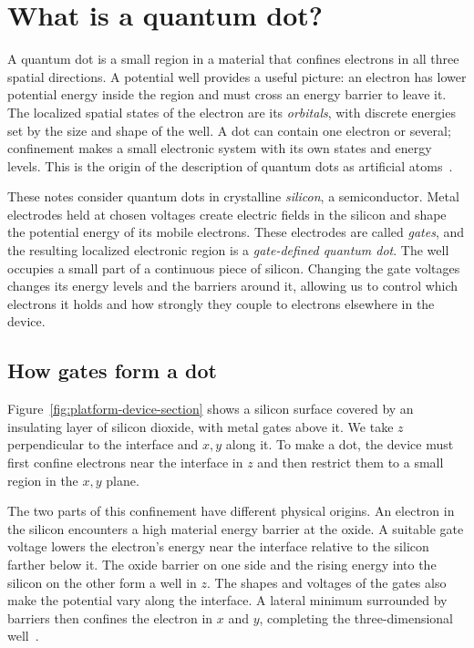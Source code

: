 \section{What is a quantum dot?}
\label{sec:quantum-dot-introduction}

A quantum dot is a small region in a material that confines electrons
in all three spatial directions. A potential well provides a useful
picture: an electron has lower potential energy inside the region and
must cross an energy barrier to leave it. The localized spatial states
of the electron are its \emph{orbitals}, with discrete energies set by
the size and shape of the well. A dot can contain one electron or several;
confinement makes a small electronic system with its own states and
energy levels. This is the origin of the description of quantum dots
as artificial atoms~\cite{Oosterkamp1998}.

These notes consider quantum dots in crystalline \emph{silicon}, a
semiconductor. Metal electrodes held at chosen voltages create electric
fields in the silicon and shape the potential energy of its mobile
electrons. These electrodes are called \emph{gates}, and the resulting
localized electronic region is a \emph{gate-defined quantum dot}.
The well occupies a small part of a continuous piece of silicon.
Changing the gate voltages changes its energy levels and the barriers
around it, allowing us to control which electrons it holds and how
strongly they couple to electrons elsewhere in the device.

\subsection{How gates form a dot}

Figure~\ref{fig:platform-device-section} shows a silicon surface covered
by an insulating layer of silicon dioxide, with metal gates above it.
We take $z$ perpendicular to the interface and $x,y$ along it. To make
a dot, the device must first confine electrons near the interface in
$z$ and then restrict them to a small region in the $x,y$ plane.

The two parts of this confinement have different physical origins.
An electron in the silicon encounters a high material energy barrier
at the oxide. A suitable gate voltage lowers the electron's energy
near the interface relative to the silicon farther below it. The
oxide barrier on one side and the rising energy into the silicon on
the other form a well in $z$. The shapes and voltages of the gates
also make the potential vary along the interface. A lateral minimum
surrounded by barriers then confines the electron in $x$ and $y$,
completing the three-dimensional well~\cite{Zwanenburg2013}.

